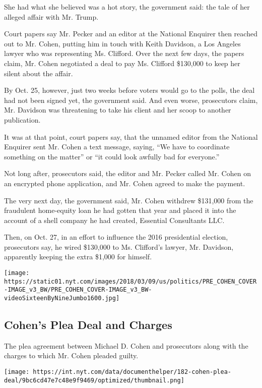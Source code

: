 She had what she believed was a hot story, the government said: the tale
of her alleged affair with Mr. Trump.

Court papers say Mr. Pecker and an editor at the National Enquirer then
reached out to Mr. Cohen, putting him in touch with Keith Davidson, a
Los Angeles lawyer who was representing Ms. Clifford. Over the next few
days, the papers claim, Mr. Cohen negotiated a deal to pay Ms. Clifford
\$130,000 to keep her silent about the affair.

By Oct. 25, however, just two weeks before voters would go to the polls,
the deal had not been signed yet, the government said. And even worse,
prosecutors claim, Mr. Davidson was threatening to take his client and
her scoop to another publication.

It was at that point, court papers say, that the unnamed editor from the
National Enquirer sent Mr. Cohen a text message, saying, ``We have to
coordinate something on the matter'' or ``it could look awfully bad for
everyone.''

Not long after, prosecutors said, the editor and Mr. Pecker called Mr.
Cohen on an encrypted phone application, and Mr. Cohen agreed to make
the payment.

The very next day, the government said, Mr. Cohen withdrew \$131,000
from the fraudulent home-equity loan he had gotten that year and placed
it into the account of a shell company he had created, Essential
Consultants LLC.

Then, on Oct. 27, in an effort to influence the 2016 presidential
election, prosecutors say, he wired \$130,000 to Ms. Clifford's lawyer,
Mr. Davidson, apparently keeping the extra \$1,000 for himself.

\texttt{[image: https://static01.nyt.com/images/2018/03/09/us/politics/PRE\_COHEN\_COVER-IMAGE\_v3\_BW/PRE\_COHEN\_COVER-IMAGE\_v3\_BW-videoSixteenByNineJumbo1600.jpg]}

\hypertarget{cohens-plea-deal-and-charges}{%
\subsection{Cohen's Plea Deal and
Charges}\label{cohens-plea-deal-and-charges}}

The plea agreement between Michael D. Cohen and prosecutors along with
the charges to which Mr. Cohen pleaded guilty.

\texttt{[image: https://int.nyt.com/data/documenthelper/182-cohen-plea-deal/9bc6cd47e7c48e9f9469/optimized/thumbnail.png]}

